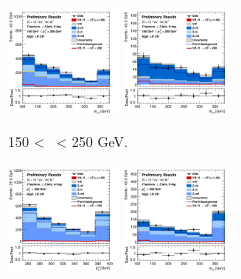 \begin{figure}[h!]
\begin{subfigure}[b]{\textwidth}
        \includegraphics[width=0.32\textwidth]{Images/VH/Own_fit/postfit_VHcc/Region_distmBB_BMax250_BMin150_DCRHigh_J3_TTypelt_incJet1_T2_L2_Y6051_GlobalFit_conditionnal_mu1.png}
        \includegraphics[width=0.32\textwidth]{Images/VH/Own_fit/postfit_VHcc/Region_distmBB_BMax250_BMin150_DCRHigh_J3_TTypett_incJet1_T2_L2_Y6051_GlobalFit_conditionnal_mu1.png}
        \caption{150 < \ptv\ < 250 GeV.}
        \label{fig:plots_VHcc_2L_150_CRH_3J}
    \end{subfigure}
    \begin{subfigure}[b]{\textwidth}
        \centering
        \includegraphics[width=0.32\textwidth]{Images/VH/Own_fit/postfit_VHcc/Region_distpTV_BMin250_DCRHigh_J3_TTypent_incJet1_T1_L2_Y6051_GlobalFit_conditionnal_mu1.png}
        \includegraphics[width=0.32\textwidth]{Images/VH/Own_fit/postfit_VHcc/Region_distmBB_BMin250_DCRHigh_J3_TTypelt_incJet1_T2_L2_Y6051_GlobalFit_conditionnal_mu1.png}

\end{subfigure}
\end{figure}
